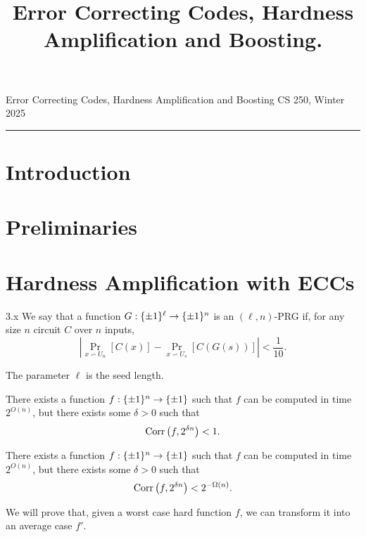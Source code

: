 \documentclass{article}
\title{Error Correcting Codes, Hardness Amplification and Boosting.}
\date{}
\begin{document}
    
\noindent Error Correcting Codes, Hardness Amplification and Boosting \hfill  CS 250, Winter 2025\\
\hrule

\section{Introduction}

\section{Preliminaries}

\section{Hardness Amplification with ECCs}

\begin{definition}{3.x}
    We say that a function $G : \{\pm 1\}^\ell \rightarrow \{\pm 1\}^{n}$ is an $(\ell, n)$-PRG if, for any size $n$ circuit $C$ over $n$ inputs, 
    \begin{equation*}
        \left|\Pr_{x \backsim U_n}[C(x)] - \Pr_{x \backsim U_s}[C(G(s))]\right| < \frac{1}{10}.
    \end{equation*}
\end{definition}

The parameter $\ell$ is the seed length.

\begin{assumption}{1} \label{a-1}
    There exists a function $f : \{\pm 1\}^n \rightarrow \{\pm 1\}$ such that $f$ can be computed in time $2^{O(n)}$, but there exists some $\delta > 0$ such that 
    \begin{equation*}
        \mathrm{Corr}\left(f, 2^{\delta n}\right) < 1.
    \end{equation*}
\end{assumption}

\begin{assumption}{2} \label{a-2}
    There exists a function $f : \{\pm 1\}^n \rightarrow \{\pm 1\}$ such that $f$ can be computed in time $2^{O(n)}$, but there exists some $\delta > 0$ such that 
    \begin{equation*}
        \mathrm{Corr}\left(f, 2^{\delta n}\right) < 2^{-\Omega(n)}.
    \end{equation*}
\end{assumption}

We will prove that, given a worst case hard function $f$, we can transform it into an average case $f'$.
\end{document}
